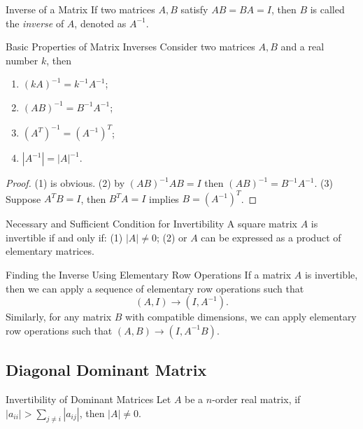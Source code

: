 \begin{definition}{Inverse of a Matrix}{}
  If two matrices $A, B$ satisfy $AB = BA = I$,
  then $B$ is called the \emph{inverse} of $A$, denoted as $A^{-1}$.
\end{definition}

\begin{proposition}{Basic Properties of Matrix Inverses}{}
  Consider two matrices $A, B$ and a real number $k$, then
  \begin{enumerate}
  \item $(kA)^{-1} = k^{-1}A^{-1}$;
  \item $(AB)^{-1} = B^{-1} A^{-1}$;
  \item $(A^T)^{-1} = (A^{-1})^T$;
  \item $|A^{-1}| = |A|^{-1}$.
  \end{enumerate}
\end{proposition}

\begin{proof}
  (1) is obvious.
  (2) by $(AB)^{-1}AB = I$ then $(AB)^{-1} = B^{-1}A^{-1}$.
  (3) Suppose $A^TB = I$, then $B^TA = I$ implies $B = (A^{-1})^T$.
\end{proof}

\begin{proposition}{Necessary and Sufficient Condition for Invertibility}{}
  A square matrix $A$ is invertible if and only if:
  (1) $|A| \neq 0$;
  (2) or $A$ can be expressed as a product of elementary matrices.
\end{proposition}

\begin{proposition}{Finding the Inverse Using Elementary Row Operations}{}
  If a matrix $A$ is invertible, then we can apply a sequence of
  elementary row operations such that
  \begin{equation}
    (A, I) \rightarrow (I, A^{-1}).
  \end{equation}
  Similarly, for any matrix $B$ with compatible dimensions,
  we can apply elementary row operations such that $(A, B)
  \rightarrow (I, A^{-1}B)$.
\end{proposition}

\subsection{Diagonal Dominant Matrix}

\begin{proposition}{Invertibility of Dominant Matrices}{}
  Let $A$ be a $n$-order real matrix, if $|a_{ii}| > \sum_{j \neq i} |a_{ij}|$,
  then $|A| \neq 0$.
\end{proposition}

